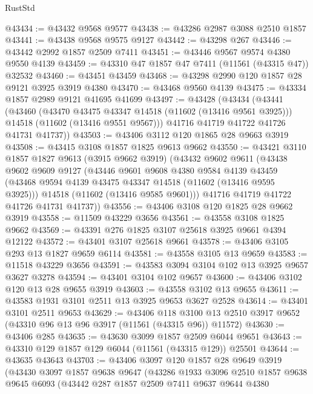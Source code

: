 \begin{lexlean}{RustStd}
\begin{coremodule}
@43434 := @43432 @9568 @9577
@43438 := @43286 @2987 @3088 @2510 @1857
@43441 := @43438 @9568 @9575 @9127
@43442 := @43298 @267
@43446 := @43442 @2992 @1857 @2509 @7411
@43451 := @43446 @9567 @9574 @4380 @9550 @4139
@43459 := @43310 @47 @1857 @47 @7411 (@11561 (@43315 @47)) @32532
@43460 := @43451 @43459
@43468 := @43298 @2990 @120 @1857 @28 @9121 @3925 @3919 @4380
@43470 := @43468 @9560 @4139
@43475 := @43334 @1857 @2989 @9121 @41695 @41699
@43497 := @43428
    (@43434
      (@43441
        (@43460
          (@43470 @43475 @43347 @14518 (@11602 (@13416 @9561 @3925)))
          @14518
          (@11602 (@13416 @9551 @9567)))
        @41716
        @41719
        @41722
        @41726
        @41731
        @41737))
@43503 := @43406 @3112 @120 @1865 @28 @9663 @3919
@43508 := @43415 @3108 @1857 @1825 @9613 @9662
@43550 := @43421
    @3110
    @1857
    @1827
    @9613
    (@3915 @9662 @3919)
    (@43432
      @9602
      @9611
      (@43438
        @9602
        @9609
        @9127
        (@43446
          @9601
          @9608
          @4380
          @9584
          @4139
          @43459
          (@43468 @9594 @4139 @43475 @43347 @14518 (@11602 (@13416 @9595 @3925)))
          @14518
          (@11602 (@13416 @9585 @9601)))
        @41716
        @41719
        @41722
        @41726
        @41731
        @41737))
@43556 := @43406 @3108 @120 @1825 @28 @9662 @3919
@43558 := @11509 @43229 @3656
@43561 := @43558 @3108 @1825 @9662
@43569 := @43391 @276 @1825 @3107 @25618 @3925 @9661 @4394 @12122
@43572 := @43401 @3107 @25618 @9661
@43578 := @43406 @3105 @293 @13 @1827 @9659 @6114
@43581 := @43558 @3105 @13 @9659
@43583 := @11518 @43229 @3656
@43591 := @43583 @3094 @3104 @102 @13 @3925 @9657 @3627 @3278
@43594 := @43401 @3104 @102 @9657
@43600 := @43406 @3102 @120 @13 @28 @9655 @3919
@43603 := @43558 @3102 @13 @9655
@43611 := @43583 @1931 @3101 @2511 @13 @3925 @9653 @3627 @2528
@43614 := @43401 @3101 @2511 @9653
@43629 := @43406
    @118
    @3100
    @13
    @2510
    @3917
    @9652
    (@43310 @96 @13 @96 @3917 (@11561 (@43315 @96)) @11572)
@43630 := @43406 @285
@43635 := @43630 @3099 @1857 @2509 @6044 @9651
@43643 := @43310 @129 @1857 @129 @6044 (@11561 (@43315 @129)) @25501
@43644 := @43635 @43643
@43703 := @43406
    @3097
    @120
    @1857
    @28
    @9649
    @3919
    (@43430
      @3097
      @1857
      @9638
      @9647
      (@43286
        @1933
        @3096
        @2510
        @1857
        @9638
        @9645
        @6093
        (@43442
          @287
          @1857
          @2509
          @7411
          @9637
          @9644
          @4380

\end{coremodule}
\end{lexlean}
